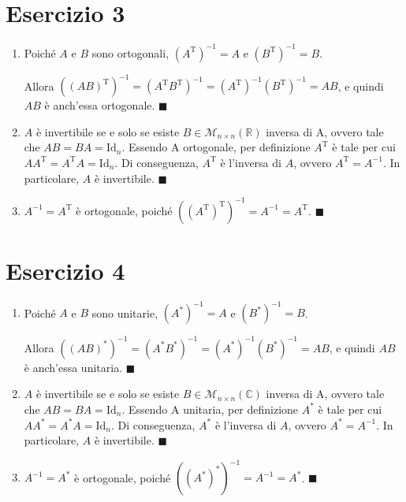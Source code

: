 \documentclass{article}
\newcommand*{\qed}{\blacksquare}
\newcommand*{\M}[3]{\mathcal{M}_{#1\times#2} \left(#3\right)}
\newcommand*{\MR}[2]{\M{#1}{#2}{\mathbb{R}}}
\newcommand*{\MC}[2]{\M{#1}{#2}{\mathbb{C}}}
\begin{document}
\section*{Esercizio 3}
\begin{enumerate}
    \item Poiché $A$ e $B$ sono ortogonali,
    $\left(A^\text{T}\right)^{-1}=A$ e $\left(B^\text{T}\right)^{-1}=B$.

    Allora $
        \left(\left(AB\right)^\text{T}\right)^{-1} =
        \left(A^\text{T}B^\text{T}\right)^{-1} =
        \left(A^\text{T}\right)^{-1}\left(B^\text{T}\right)^{-1} =
        AB
    $, e quindi $AB$ è anch'essa ortogonale. $\qed$
    \item $A$ è invertibile se e solo se esiste $B\in\MR{n}{n}$
    inversa di A, ovvero tale che $AB=BA=\text{Id}_n$.
    Essendo A ortogonale, per definizione $A^\text{T}$ è tale per cui
    $A A^\text{T} = A^\text{T} A = \text{Id}_n$. Di conseguenza,
    $A^\text{T}$ è l'inversa di $A$, ovvero $A^\text{T} = A^{-1}$.
    In particolare, $A$ è invertibile. $\qed$
    \item $A^{-1}=A^\text{T}$ è ortogonale, poiché
    $\left(\left(A^\text{T}\right)^\text{T}\right)^{-1}=A^{-1}=A^\text{T}$.
    $\qed$
\end{enumerate}

\section*{Esercizio 4}
\begin{enumerate}
    \item Poiché $A$ e $B$ sono unitarie,
    $\left(A^*\right)^{-1}=A$ e $\left(B^*\right)^{-1}=B$.

    Allora $
        \left(\left(AB\right)^*\right)^{-1} =
        \left(A^*B^*\right)^{-1} =
        \left(A^*\right)^{-1}\left(B^*\right)^{-1} =
        AB
    $, e quindi $AB$ è anch'essa unitaria. $\qed$
    \item $A$ è invertibile se e solo se esiste $B\in\MC{n}{n}$
    inversa di A, ovvero tale che $AB=BA=\text{Id}_n$.
    Essendo A unitaria, per definizione $A^*$ è tale per cui
    $A A^* = A^* A = \text{Id}_n$. Di conseguenza,
    $A^*$ è l'inversa di $A$, ovvero $A^* = A^{-1}$.
    In particolare, $A$ è invertibile. $\qed$
    \item $A^{-1}=A^*$ è ortogonale, poiché
    $\left(\left(A^*\right)^*\right)^{-1}=A^{-1}=A^*$.
    $\qed$
\end{enumerate}
\end{document}
